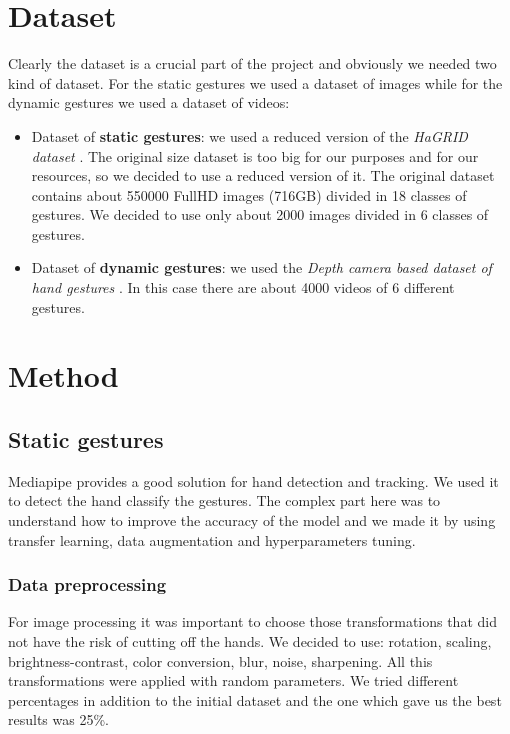 \documentclass[10pt,twocolumn,letterpaper]{article}
\begin{document}
\section{Dataset}
Clearly the dataset is a crucial part of the project and obviously we needed two kind of dataset. For the static gestures 
we used a dataset of images while for the dynamic gestures we used a dataset of videos:
\begin{itemize}
   \item Dataset of \textbf{static gestures}: we used a reduced version of the \textit{HaGRID dataset} \cite{Alexander_2024}. The original size dataset
   is too big for our purposes and for our resources, so we decided to use a reduced version of it. The original dataset contains about 550000 FullHD images (716GB)
   divided in 18 classes of gestures. We decided to use only about 2000 images divided in 6 classes of gestures.
   \item Dataset of \textbf{dynamic gestures}: we used the \textit{Depth camera based dataset of hand gestures} \cite{JEERU2022108659}. In this case there are about 4000 videos of 
   6 different gestures.
\end{itemize}

\section{Method}
\subsection{Static gestures}
Mediapipe provides a good solution for hand detection and tracking. We used it to detect the hand classify the gestures.
The complex part here was to understand how to improve the accuracy of the model and we made it by using transfer learning, data augmentation and hyperparameters tuning.
\subsubsection{Data preprocessing}
For image processing it was important to choose those transformations that did not have the risk of cutting off the hands. We decided to use: rotation, scaling, 
brightness-contrast, color conversion, blur, noise, sharpening. All this transformations were applied with random parameters.
We tried different percentages in addition to the initial dataset and the one which gave us the best results was 25\%.  
\end{document}
